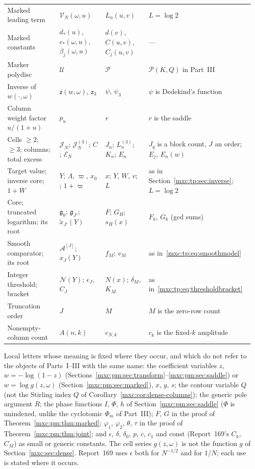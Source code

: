 \documentclass[11pt]{article}
\numberwithin{equation}{section}
\theoremstyle{definition}
\theoremstyle{remark}
\begin{document}
{\begin{longtable}{@{}>{\raggedright\arraybackslash}p{}>{\raggedright\arraybackslash}p{}>{\raggedright\arraybackslash}p{}>{\raggedright\arraybackslash}p{}@{}}
Marked leading term & $\mathcal V_N(\omega,u)$ & $L_n(u,v)$ & $L=\log2$\\
Marked constants & $d_*(u)$, $c_*(\omega,u)$, $\beta_j(\omega,u)$ & $d(v)$, $C(u,v)$, $C_j(u,v)$ & ---\\
Marker polydisc & $\mathcal U$ & $\mathcal P$ & $\mathcal P(K,Q)$ in Part~III\\
Inverse of $w(\cdot,\omega)$ & $\mathsf z(w,\omega)$, $\mathsf z_3$ & $\psi$, $\psi_3$ & $\psi$ is Dedekind's function\\
Column weight factor $u/(1+u)$ & $p_u$ & $r$ & $r$ is the saddle\\
Cells $\ge2$; $\ge3$; columns; total excess & $\mathcal J_N$; $\mathcal J^{(3)}_N$; $C$; $\mathcal E_N$ & $J_n$; $L_n^{(3)}$; $K_n$; $E_n$ & $J_q$ is a block count, $J$ an order; $E_j$, $E_n(w)$\\
Target value; inverse core; $1+W$ & $Y$; $\Lambda$, $\varpi$, $x_0$; $1+\varpi$ & $x$; $Y$, $W$, $v$; $L$ & as in Section~\ref{mxc:tp:sec:inverse}; $L=\log2$\\
Core; truncated logarithm; its root & $\mathfrak g_0$; $\mathfrak g_{J'}$; $\widetilde x_{J'}(Y)$ & $F$; $G_H$; $s_H(x)$ & $F_k$, $G_k$ (gcd sums)\\
Smooth comparator; its root & $\mathcal A^{[J]}$; $x_J(Y)$ & $f_M$; $v_M$ & as in~\eqref{mxc:tp:eq:smoothmodel}\\
Integer threshold; bracket & $\mathcal N(Y)$; $\epsilon_J$, $C_J$ & $N(x)$; $\delta_M$, $K_M$ & as in~\eqref{mxc:tp:eq:thresholdbracket}\\
Truncation order & $J$ & $M$ & $M$ is the zero-row count\\
Nonempty-column count & $A(n,k)$ & $c_{N,k}$ & $c_k$ is the fixed-$k$ amplitude\\
\end{longtable}
}

Local letters whose meaning is fixed where they occur, and which do not
refer to the objects of Parts~I--III with the same name: the coefficient
variables $z$, $w=-\log(1-z)$ (Sections~\ref{mxc:pm:sec:transform}--\ref{mxc:pm:sec:saddle})
or $w=\log g(z,\omega)$ (Section~\ref{mxc:pm:sec:marked}), $x$, $y$, $s$; the
contour variable $Q$ (not the Stirling index $Q$ of
Corollary~\ref{mxc:cor:dense-columns}); the generic pole argument $R$; the
phase functions $I$, $\Phi$, $h$ of Section~\ref{mxc:pm:sec:saddle} ($\Phi$ is
unindexed, unlike the cyclotomic $\Phi_m$ of Part~III); $F$, $G$ in the proof
of Theorem~\ref{mxc:pm:thm:marked}; $\varphi_1$, $\varphi_2$, $\theta$, $\tau$ in
the proof of Theorem~\ref{mxc:pm:thm:joint}; and $\epsilon$, $\delta$,
$\delta_0$, $p$, $c$, $c_1$ and $\mathrm{const}$ (Report~169's $C_k$, $C_M$)
as small or generic constants. The cell series $g(z,\omega)$ is not the
function $g$ of Section~\ref{mxc:sec:dense}. Report~169 uses $\epsilon$ both
for $N^{-1/2}$ and for $1/N$; each use is stated where it occurs.
\end{document}

